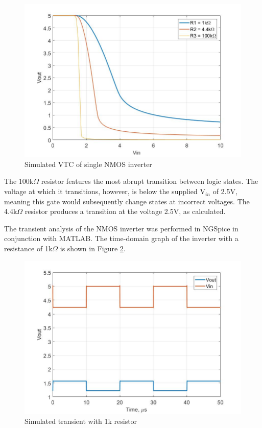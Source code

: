 \begin{figure}[H]
    \centering
    \includegraphics[scale = .30]{CircuitDevelopment/NMOS/VTC_single_NMOS.jpg}
    \caption{Simulated VTC of single NMOS inverter}
    \label{fig:VTCNMOS}
\end{figure}

 The 100k$\Omega$ resistor features the most abrupt transition between logic states. The voltage at which it transitions, however, is below the supplied V$_{in}$ of 2.5V, meaning this gate would subsequently change states at incorrect voltages. The 4.4k$\Omega$ resistor produces a transition at the voltage 2.5V, as calculated. 
\newline

The transient analysis of the NMOS inverter was performed in NGSpice in conjunction with MATLAB. The time-domain graph of the inverter with a resistance of 1k$\Omega$ is shown in Figure \ref{fig:1ktran}.

\begin{figure}[H]
    \centering
    \includegraphics[scale = .30]{CircuitDevelopment/NMOS/tran_1k_nmos.jpg}
    \caption{Simulated transient with 1k resistor}
    \label{fig:1ktran}
\end{figure}

